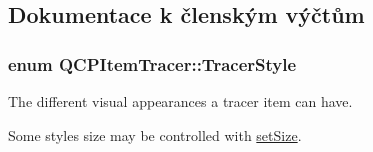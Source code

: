 \subsection{Dokumentace k členským výčtům}
\hypertarget{classQCPItemTracer_a2f05ddb13978036f902ca3ab47076500}{}
\subsubsection[{Tracer\+Style}]{\setlength{\rightskip}{0pt plus 5cm}enum {\bf Q\+C\+P\+Item\+Tracer\+::\+Tracer\+Style}}\label{classQCPItemTracer_a2f05ddb13978036f902ca3ab47076500}


The different visual appearances a tracer item can have. 

Some styles size may be controlled with \hyperlink{classQCPItemTracer_ae47fe0617f5fef5fdb766999569be10a}{set\+Size}.


